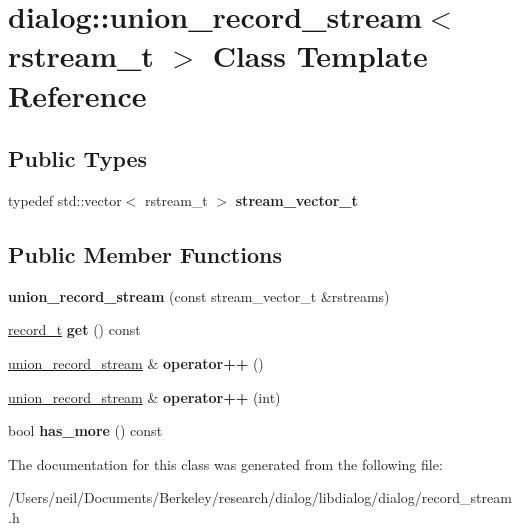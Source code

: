 \hypertarget{classdialog_1_1union__record__stream}{}\section{dialog\+:\+:union\+\_\+record\+\_\+stream$<$ rstream\+\_\+t $>$ Class Template Reference}
\label{classdialog_1_1union__record__stream}
\subsection*{Public Types}
\begin{DoxyCompactItemize}
\item 
\mbox{\label{classdialog_1_1union__record__stream_adc2268e097c6a87401608880db6683ad}} 
typedef std\+::vector$<$ rstream\+\_\+t $>$ {\bfseries stream\+\_\+vector\+\_\+t}
\end{DoxyCompactItemize}
\subsection*{Public Member Functions}
\begin{DoxyCompactItemize}
\item 
\mbox{\label{classdialog_1_1union__record__stream_a87adf97ded0c364328a8d4d6c05c67e8}} 
{\bfseries union\+\_\+record\+\_\+stream} (const stream\+\_\+vector\+\_\+t \&rstreams)
\item 
\mbox{\label{classdialog_1_1union__record__stream_a5c778787a04599d1632567d875adb78f}} 
\hyperlink{structdialog_1_1record__t}{record\+\_\+t} {\bfseries get} () const
\item 
\mbox{\label{classdialog_1_1union__record__stream_a861d76a525e5301099a752cee7a12c39}} 
\hyperlink{classdialog_1_1union__record__stream}{union\+\_\+record\+\_\+stream} \& {\bfseries operator++} ()
\item 
\mbox{\label{classdialog_1_1union__record__stream_a1dd62584b7ac4093214531ba214c21dd}} 
\hyperlink{classdialog_1_1union__record__stream}{union\+\_\+record\+\_\+stream} \& {\bfseries operator++} (int)
\item 
\mbox{\label{classdialog_1_1union__record__stream_adfff04e32d3390cc8ca38a4e356e8d31}} 
bool {\bfseries has\+\_\+more} () const
\end{DoxyCompactItemize}


The documentation for this class was generated from the following file\+:\begin{DoxyCompactItemize}
\item 
/\+Users/neil/\+Documents/\+Berkeley/research/dialog/libdialog/dialog/record\+\_\+stream.\+h\end{DoxyCompactItemize}
